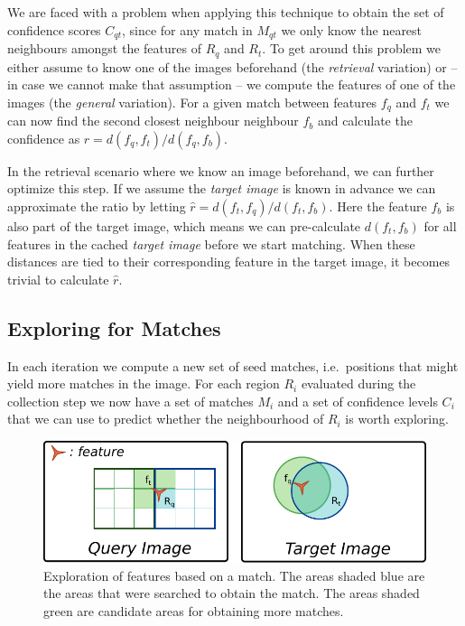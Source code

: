 \documentclass[runningheads]{llncs}
\begin{document}
We are faced with a problem when applying this technique to obtain the set of confidence scores $C_{qt}$, since for any match in $M_{qt}$ we only know the nearest neighbours amongst the features of $R_q$ and $R_t$. To get around this problem we either assume to know one of the images beforehand (the \emph{retrieval} variation) or -- in case we cannot make that assumption -- we compute the features of one of the images (the \emph{general} variation). For a given match between features $f_q$ and $f_t$ we can now find the second closest neighbour neighbour $f_b$ and calculate the confidence as $r = d(f_q, f_t)/d(f_q,f_b)$.

In the retrieval scenario where we know an image beforehand, we can further optimize this step. If we assume the \emph{target image} is known in advance we can approximate the ratio by letting $\hat r = d(f_t, f_q)/d(f_t,f_b)$. Here the feature $f_b$ is also part of the target image, which means we can pre-calculate $d(f_t, f_b)$ for all features in the cached \emph{target image} before we start matching. When these distances are tied to their corresponding feature in the target image, it becomes trivial to calculate $\hat r$.

\subsection{Exploring for Matches}
\label{exploring}
%
In each iteration we compute a new set of seed matches, i.e.\ positions that might yield more matches in the image. For each region $R_i$ evaluated during the collection step we now have a set of matches $M_i$ and a set of confidence levels $C_i$ that we can use to predict whether the neighbourhood of $R_i$ is worth exploring.

\begin{figure}[ht]
\centering
\includegraphics[width=0.75\columnwidth]{images/exploration}
\caption{Exploration of features based on a match. The areas shaded blue are the areas that were searched to obtain the match. The areas shaded green are candidate areas for obtaining more matches.}
\label{fig:exploration}
\end{figure}
\end{document}
